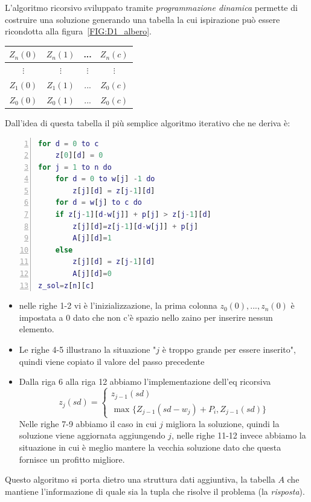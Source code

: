 \documentclass[a4paper]{article}
\begin{document}
L'algoritmo ricorsivo sviluppato tramite \textit{programmazione dinamica} permette di costruire una soluzione generando una tabella la cui ispirazione può essere ricondotta alla figura~\ref{FIG:D1_albero}.\\
\begin{center}
	\begin{tabular}{| c | c | c | c |}
  \hline
  $Z_n(0)$ & $Z_n(1)$ & ... &  $Z_n(c)$ \\
  \hline
  $ \vdots$ & $\vdots$ & $\vdots$ &  $\vdots $ \\
  \hline
  $Z_1(0)$ & $Z_1(1)$ & ... &  $Z_0(c)$ \\
  \hline
  $Z_0(0)$ & $Z_0(1)$ & ... &  $Z_0(c)$ \\
  \hline
	\end{tabular}
\end{center}
Dall'idea di questa tabella il più semplice algoritmo iterativo che ne deriva è:
\begin{lstlisting}[numbers=left,firstnumber=1,stepnumber=1, xleftmargin=15pt, language=Matlab ]
for d = 0 to c
    z[0][d] = 0
for j = 1 to n do
    for d = 0 to w[j] -1 do
    	z[j][d] = z[j-1][d]
    for d = w[j] to c do
	if z[j-1][d-w[j]] + p[j] > z[j-1][d] 
	    z[j][d]=z[j-1][d-w[j]] + p[j]
	    A[j][d]=1
	else
	    z[j][d] = z[j-1][d]
	    A[j][d]=0
z_sol=z[n][c]
\end{lstlisting}
\begin{itemize}
	\item nelle righe 1-2 vi è l'inizializzazione, la prima colonna $z_0(0),...,z_n(0)$ è impostata a 0 dato che non c'è spazio nello zaino per inserire nessun elemento.\\
	\item Le righe 4-5 illustrano la situazione "$j$ è troppo grande per essere inserito", quindi viene copiato il valore del passo precedente
	\item Dalla riga 6 alla riga 12 abbiamo l'implementazione dell'eq ricorsiva
	\begin{equation*}
        	z_j(sd)= \begin{cases} z_{j-1}(sd)\\
        	\text{ max } \{ Z_{j-1}(sd - w_j) + P_i , Z_{j-1}(sd) \}
	\end{cases}
	\end{equation*}
	Nelle righe 7-9 abbiamo il caso in cui $j$ migliora la soluzione, quindi la soluzione viene aggiornata aggiungendo $j$, nelle righe 11-12 invece abbiamo la situazione in cui è meglio mantere la vecchia soluzione dato che questa fornisce un profitto migliore.
\end{itemize}
\newpage
Questo algoritmo si porta dietro una struttura dati aggiuntiva, la tabella $A$ che mantiene l'informazione di quale sia la tupla che risolve il problema (la \textit{risposta}).
\end{document}
